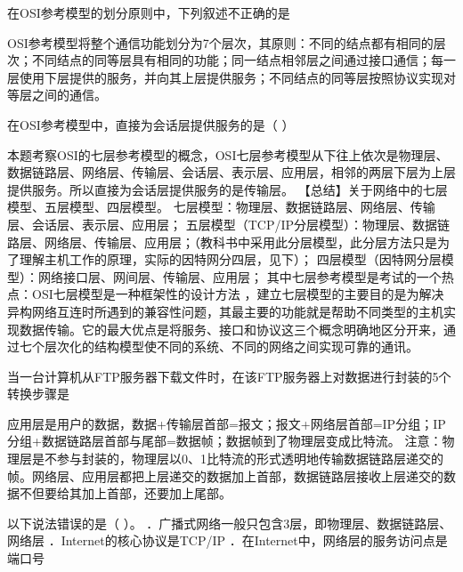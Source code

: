 \question 在OSI参考模型的划分原则中，下列叙述不正确的是
\par{}
\begin{solution}OSI参考模型将整个通信功能划分为7个层次，其原则：不同的结点都有相同的层次；不同结点的同等层具有相同的功能；同一结点相邻层之间通过接口通信；每一层使用下层提供的服务，并向其上层提供服务；不同结点的同等层按照协议实现对等层之间的通信。
\end{solution}
\question 在OSI参考模型中，直接为会话层提供服务的是（ ）
\par{}
\begin{solution}本题考察OSI的七层参考模型的概念，OSI七层参考模型从下往上依次是物理层、数据链路层、网络层、传输层、会话层、表示层、应用层，相邻的两层下层为上层提供服务。所以直接为会话层提供服务的是传输层。
【总结】关于网络中的七层模型、五层模型、四层模型。
七层模型：物理层、数据链路层、网络层、传输层、会话层、表示层、应用层；
五层模型（TCP/IP分层模型）：物理层、数据链路层、网络层、传输层、应用层；（教科书中采用此分层模型，此分层方法只是为了理解主机工作的原理，实际的因特网分四层，见下）；
四层模型（因特网分层模型）：网络接口层、网间层、传输层、应用层；
其中七层参考模型是考试的一个热点：OSI七层模型是一种框架性的设计方法
，建立七层模型的主要目的是为解决异构网络互连时所遇到的兼容性问题，其最主要的功能就是帮助不同类型的主机实现数据传输。它的最大优点是将服务、接口和协议这三个概念明确地区分开来，通过七个层次化的结构模型使不同的系统、不同的网络之间实现可靠的通讯。
\end{solution}
\question 当一台计算机从FTP服务器下载文件时，在该FTP服务器上对数据进行封装的5个转换步骤是
\par{}
\begin{solution}应用层是用户的数据，数据+传输层首部=报文；报文+网络层首部=IP分组；IP分组+数据链路层首部与尾部=数据帧；数据帧到了物理层变成比特流。
注意：物理层是不参与封装的，物理层以0、1比特流的形式透明地传输数据链路层递交的帧。网络层、应用层都把上层递交的数据加上首部，数据链路层接收上层递交的数据不但要给其加上首部，还要加上尾部。
\end{solution}
\question 以下说法错误的是（ ）。
．广播式网络一般只包含3层，即物理层、数据链路层、网络层
．Internet的核心协议是TCP/IP
．在Internet中，网络层的服务访问点是端口号
